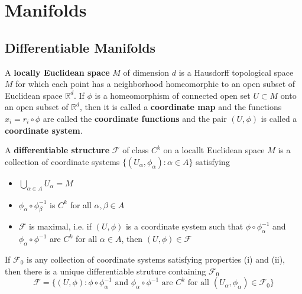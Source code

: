 \section{Manifolds}

\subsection{Differentiable Manifolds}

\begin{definition}
    A \textbf{locally Euclidean space} $M$ of dimension $d$ is a Hausdorff topological space $M$ for which each point has a neighborhood homeomorphic to an open subset of Euclidean space $\mathbb{R}^d$. If $\phi$ is a homeomorphism of connected open set $U\subset M$ onto an open subset of $\mathbb{R}^d$, then it is called a \textbf{coordinate map} and the functions $x_i = r_i\circ \phi$ are called the \textbf{coordinate functions} and the pair $(U,\phi)$ is called a \textbf{coordinate system}. 
\end{definition}

\begin{definition}
    A \textbf{differentiable structure} $\mathcal{F}$ of class $C^k$ on a locallt Euclidean space $M$ is a collection of coordinate systems $\{(U_{\alpha},\phi_{\alpha}):\alpha \in A\}$ satisfying
    \begin{itemize}
        \item $\bigcup_{\alpha \in A} U_{\alpha} = M$
        \item $\phi_{\alpha} \circ \phi_{\beta}^{-1}$ is $C^k$ for all $\alpha,\beta \in A$
        \item $\mathcal{F}$ is maximal, i.e. if $(U,\phi)$ is a coordinate system such that $\phi\circ \phi_{\alpha}^{-1}$ and $\phi_{\alpha} \circ \phi^{-1}$ are $C^k$ for all $\alpha \in A$, then $(U,\phi) \in \mathcal{F}$
    \end{itemize}
\end{definition}

\begin{proposition}
    If $\mathcal{F}_0$ is any collection of coordinate systems satisfying properties (i) and (ii), then there is a unique differentiable struture containing $\mathcal{F}_0$
    \[\mathcal{F} = \{(U,\phi):\phi\circ\phi_{\alpha}^{-1}\text{ and }\phi_{\alpha}\circ\phi^{-1}\text{ are }C^k\text{ for all }(U_{\alpha},\phi_{\alpha}) \in \mathcal{F}_0\}\]
\end{proposition}

